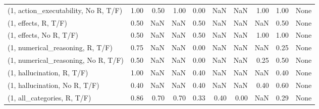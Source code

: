 \begin{table*}[h!]
\begin{adjustbox}{width=2\columnwidth,center}
\begin{tabular}{lrrr|rrr|rrr}
(1, action\_executability, No R, T/F) &                      1.00 &                  0.50 &                      1.00 &                          0.00 &                       NaN &                           NaN &                                   1.00 &                               1.00 &                                  None \\
(1, effects, R, T/F)                 &                      0.50 &                   NaN &                       NaN &                          0.50 &                       NaN &                           NaN &                                    NaN &                               0.50 &                                  None \\
(1, effects, No R, T/F)              &                      0.50 &                   NaN &                       NaN &                          0.50 &                       NaN &                           NaN &                                   1.00 &                               1.00 &                                  None \\
(1, numerical\_reasoning, R, T/F)     &                      0.75 &                   NaN &                       NaN &                          0.00 &                       NaN &                           NaN &                                    NaN &                               0.25 &                                  None \\
(1, numerical\_reasoning, No R, T/F)  &                      0.50 &                   NaN &                       NaN &                          0.00 &                       NaN &                           NaN &                                   0.25 &                               0.50 &                                  None \\
(1, hallucination, R, T/F)           &                      1.00 &                   NaN &                       NaN &                          0.40 &                       NaN &                           NaN &                                    NaN &                               0.40 &                                  None \\
(1, hallucination, No R, T/F)        &                      0.40 &                   NaN &                       NaN &                          0.40 &                       NaN &                           NaN &                                   0.40 &                               0.60 &                                  None \\
(1, all\_categories, R, T/F)          &                      0.86 &                  0.70 &                      0.70 &                          0.33 &                      0.40 &                          0.00 &                                    NaN &                               0.29 &                                  None \\

\end{tabular}
\end{adjustbox}
\end{table*}
